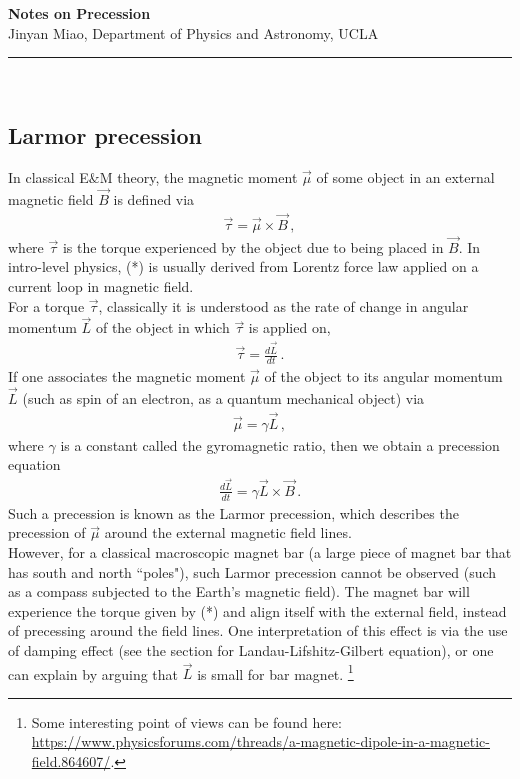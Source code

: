 \documentclass[11pt]{article}
\begin{document}
\Large \noindent \textbf{Notes on Precession }\\
\normalsize
Jinyan Miao, Department of Physics and Astronomy, UCLA\\
\noindent\rule{8cm}{0.4pt}\\
\subsection{Larmor precession}
In classical E$\&$M theory, the magnetic moment $\vec{\mu}$ of some object in an external magnetic field $\vec{B}$ is defined via
\begin{align*}
\vec{\tau} = \vec{\mu} \times \vec{B}\,,\tag{*}
\end{align*}
where $\vec{\tau}$ is the torque experienced by the object due to being placed in $\vec{B}$. In intro-level physics, (*) is usually derived from Lorentz force law applied on a current loop in magnetic field. \\

For a torque $\vec{\tau}$, classically it is understood as the rate of change in angular momentum $\vec{L}$ of the object in which $\vec{\tau}$ is applied on, 
\begin{align*}
\vec{\tau} = \frac{d\vec{L}}{dt}\,.
\end{align*}
If one associates the magnetic moment $\vec{\mu}$ of the object to its angular momentum $\vec{L}$ (such as spin of an electron, as a quantum mechanical object) via
\begin{align*}
\vec{\mu} =\gamma\vec{L}\,,
\end{align*}
where $\gamma$ is a constant called the gyromagnetic ratio, then we obtain a precession equation 
\begin{align*}
\frac{d\vec{L}}{dt} = \gamma \vec{L}\times \vec{B}\,.
\end{align*}
Such a precession is known as the Larmor precession, which describes the precession of $\vec{\mu}$ around the external magnetic field lines. \\

However, for a classical macroscopic magnet bar (a large piece of magnet bar that has south and north ``poles"), such Larmor precession cannot be observed (such as a compass subjected to the Earth's magnetic field). The magnet bar will experience the torque given by (*) and align itself with the external field, instead of precessing around the field lines. One interpretation of this effect is via the use of damping effect (see the section for Landau-Lifshitz-Gilbert equation), or one can explain by arguing that $\vec{L}$ is small for bar magnet. \footnote{Some interesting point of views can be found here: \url{https://www.physicsforums.com/threads/a-magnetic-dipole-in-a-magnetic-field.864607/}.}\\
\end{document}
